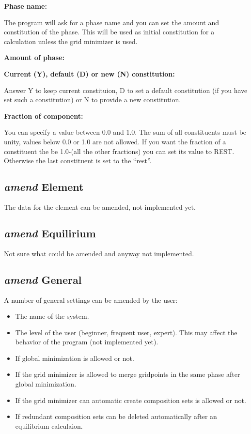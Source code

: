 \documentclass[11pt]{article}
\begin{document}
\hypertarget{Amend const phase name}{{\bf Phase name:}}

The program will ask for a phase name and you can set the amount
and constitution of the phase.  This will be used as initial
constitution for a calculation unless the grid minimizer is used.

\hypertarget{Amend const amount}{{\bf Amount of phase:}}


{\bf Current (Y), default (D) or new (N) constitution:}

Answer Y to keep current constituion, D to set a default constitution
(if you have set such a constitution) or N to provide a new
constitution.

{\bf Fraction of component: }

You can specify a value between 0.0 and 1.0.  The sum of all
constituents must be unity, values below 0.0 or 1.0 are not allowed.
If you want the fraction of a constituent the be 1.0-(all the other
fractions) you can set its value to REST.  Otherwise the last
constituent is set to the ``rest''.

\hypertarget{Amend element}{}
\subsection{{\em amend} Element}

The data for the element can be amended, not implemented yet.

\hypertarget{Amend equilibrium}{}
\subsection{{\em amend} Equilirium}

Not sure what could be amended and anyway not implemented.

\hypertarget{Amend general}{}
\subsection{{\em amend} General}

A number of general settings can be amended by the user:

\begin{itemize}
\item The name of the system.
\item The level of the user (beginner, frequent user, expert).  This
  may affect the behavior of the program (not implemented yet).
\item If global minimization is allowed or not.
\item If the grid minimizer is allowed to merge gridpoints in the same
  phase after global minimization.
\item If the grid minimizer can automatic create composition sets is
  allowed or not.
\item If redundant composition sets can be deleted automatically after
  an equilibrium calculaion.
\end{itemize}
\end{document}
